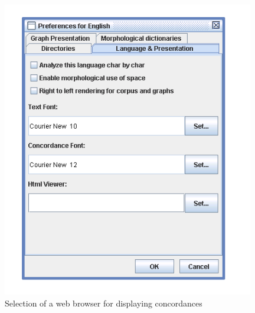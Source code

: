 \bigskip
\begin{figure}[h]
\begin{center}
\includegraphics[width=11cm]{resources/img/fig4-7.png}
\caption{Selection of a web browser for displaying
concordances\label{fig-browser-selection}}
\end{center}
\end{figure}

